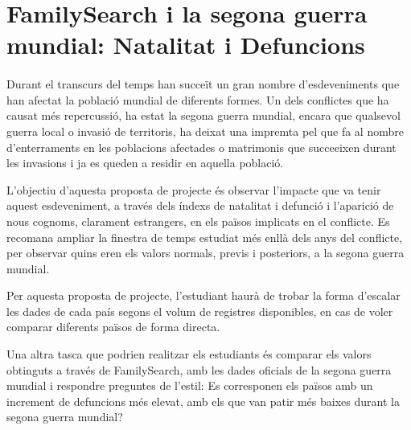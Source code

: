 \section{FamilySearch i la segona guerra mundial: Natalitat i Defuncions}

    \paragraph{}
    Durant el transcurs del temps han succeït un gran nombre d'esdeveniments que han afectat la població mundial de diferents formes. Un dels conflictes que ha causat més repercussió, ha estat la segona guerra mundial, encara que qualsevol guerra local o invasió de territoris, ha deixat una impremta pel que fa al nombre d'enterraments en les poblacions afectades o matrimonis que succeeixen durant les invasions i ja es queden a residir en aquella població.

    L'objectiu d'aquesta proposta de projecte és observar l'impacte que va tenir aquest esdeveniment, a través dels índexs de natalitat i defunció i l'aparició de nous cognoms, clarament estrangers, en els països implicats en el conflicte. Es recomana ampliar la finestra de temps estudiat més enllà dels anys del conflicte, per observar quins eren els valors normals, previs i posteriors, a la segona guerra mundial.

    Per aquesta proposta de projecte, l'estudiant haurà de trobar la forma d'escalar les dades de cada país segons el volum de registres disponibles, en cas de voler comparar diferents països de forma directa.

    Una altra tasca que podrien realitzar els estudiants és comparar els valors ob\-tin\-guts a través de FamilySearch, amb les dades oficials de la segona guerra mundial i respon\-dre preguntes de l'estil: Es corresponen els països amb un increment de defuncions més elevat, amb els que van patir més baixes durant la segona guerra mundial?
